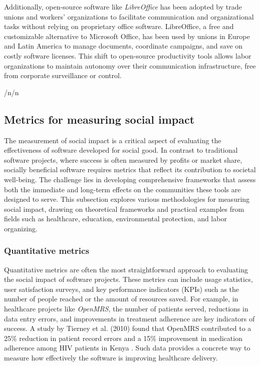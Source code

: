 \begin{refsection}
Additionally, open-source software like \textit{LibreOffice} has been adopted by trade unions and workers' organizations to facilitate communication and organizational tasks without relying on proprietary office software. LibreOffice, a free and customizable alternative to Microsoft Office, has been used by unions in Europe and Latin America to manage documents, coordinate campaigns, and save on costly software licenses. This shift to open-source productivity tools allows labor organizations to maintain autonomy over their communication infrastructure, free from corporate surveillance or control.

/n/n\subsection{Metrics for measuring social impact}

The measurement of social impact is a critical aspect of evaluating the effectiveness of software developed for social good. In contrast to traditional software projects, where success is often measured by profits or market share, socially beneficial software requires metrics that reflect its contribution to societal well-being. The challenge lies in developing comprehensive frameworks that assess both the immediate and long-term effects on the communities these tools are designed to serve. This subsection explores various methodologies for measuring social impact, drawing on theoretical frameworks and practical examples from fields such as healthcare, education, environmental protection, and labor organizing.

\subsubsection{Quantitative metrics}

Quantitative metrics are often the most straightforward approach to evaluating the social impact of software projects. These metrics can include usage statistics, user satisfaction surveys, and key performance indicators (KPIs) such as the number of people reached or the amount of resources saved. For example, in healthcare projects like \textit{OpenMRS}, the number of patients served, reductions in data entry errors, and improvements in treatment adherence are key indicators of success. A study by Tierney et al. (2010) found that OpenMRS contributed to a 25\% reduction in patient record errors and a 15\% improvement in medication adherence among HIV patients in Kenya \cite[pp.~150-153]{tierney2010}. Such data provides a concrete way to measure how effectively the software is improving healthcare delivery.


\end{refsection}

